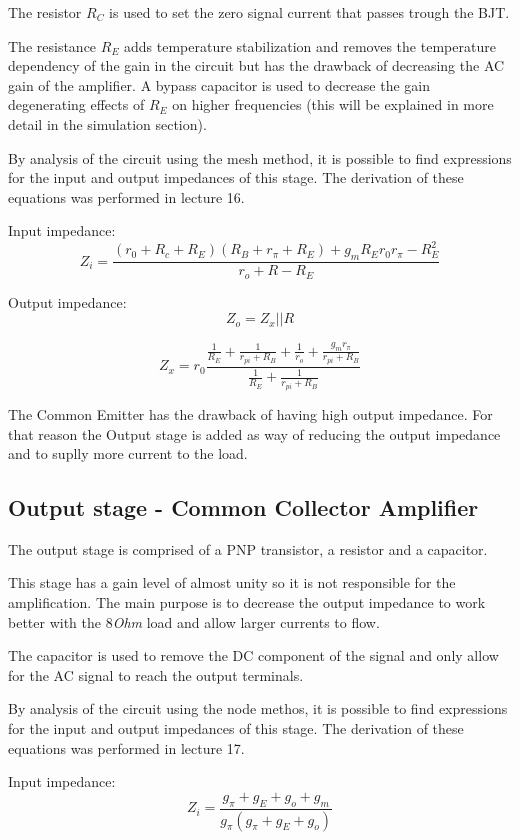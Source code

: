 The resistor $R_C$ is used to set the zero signal current that passes trough the BJT.

The resistance $R_E$ adds temperature stabilization and removes the temperature dependency of the gain in the circuit but has the drawback of decreasing the AC gain of the amplifier. A bypass capacitor is used to decrease the gain degenerating effects of $R_E$ on higher frequencies (this will be explained in more detail in the simulation section).



By analysis of the circuit using the mesh method, it is possible to find expressions for the input and output impedances of this stage. The derivation of these equations was performed in lecture 16.


Input impedance:
\[
Z_i=\frac{(r_0+R_c+R_E)(R_B+r_{\pi}+R_E) + g_mR_Er_0r_{\pi}-R_E^2}{r_o + R - R_E}
\]


Output impedance:
\[
Z_o=Z_x||R
\]

\[
Z_x=r_0\frac{\frac{1}{R_E}+\frac{1}{r_{pi}+R_B}+\frac{1}{r_o}+\frac{g_mr_{\pi}}{r_{pi}+R_B}}{\frac{1}{R_E}+\frac{1}{r_{pi}+R_B}}
\]

The Common Emitter has the drawback of having high output impedance. For that reason the Output stage is added as way of reducing the output impedance and to suplly more current to the load.

\subsection{Output stage - Common Collector Amplifier}
\label{subsec:envdet}

The output stage is comprised of a PNP transistor, a resistor and a capacitor.


This stage has a gain level of almost unity so it is not responsible for the amplification. The main purpose is to decrease the output impedance to work better with the $8${\emph {Ohm}} load and allow larger currents to flow.


The capacitor is used to remove the DC component of the signal and only allow for the AC signal to reach the output terminals.


By analysis of the circuit using the node methos, it is possible to find expressions for the input and output impedances of this stage. The derivation of these equations was performed in lecture 17.


Input impedance:
\[
Z_i = \frac{g_{\pi}+g_E+g_o+g_m}{g_{\pi}(g_{\pi}+g_E+g_o)}
\]

